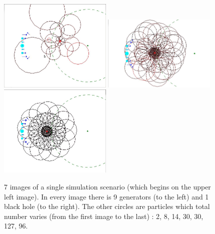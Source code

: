 \documentclass[a4paper]{article} %
\begin{document}
\begin{multicols*}{2}
\begin{figure}[H]
\end{figure}
\begin{figure}[H]
\centering
\includegraphics[width=0.48\textwidth]{5.jpg}
\includegraphics[width=0.48\textwidth]{6.jpg}
\includegraphics[width=0.48\textwidth]{7.jpg}

\caption{7 images of a single simulation scenario (which begins on the upper left image). In every image there is 9 generators (to the left) and 1 black hole (to the right).
The other circles are particles which total number varies (from the first image to the last) : 2, 8, 14, 30, 30, 127, 96.}
\end{figure}
\label{lastpage}
\end{multicols*}
\end{document}
